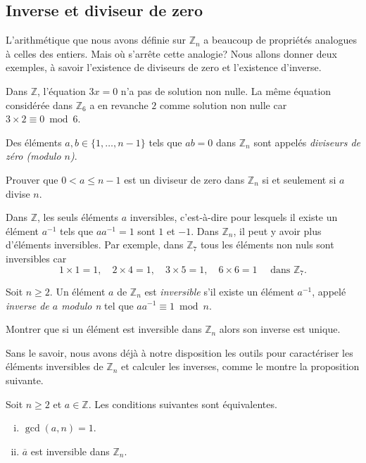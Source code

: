 \documentclass[french,course,oneside,theoremnosection]{lecture}
\newcommand{\Z}{\mathbb{Z}}
\begin{document}
\subsection{Inverse et diviseur de zero}
L'arithmétique que nous avons définie sur $\Z_n$ a beaucoup de propriétés analogues à celles des entiers. Mais où s'arrête cette analogie? Nous allons donner deux exemples, à savoir l'existence de diviseurs de zero et l'existence d'inverse.
\begin{example}
Dans $\Z$, l'équation $3x=0$ n'a pas de solution non nulle. La même équation considérée dans $\Z_6$ a en revanche $2$ comme solution non nulle car $3\times 2 \equiv 0 \bmod 6$.
\end{example}
\begin{definition}
Des éléments $a,b\in\{1, \ldots, n-1\}$ tels que $ab = 0$ dans $\Z_n$ sont appelés \emph{diviseurs de zéro (modulo $n$)}. 
\end{definition}

\begin{exercise}
Prouver que $0 < a \leq n-1$ est un diviseur de zero dans $\Z_n$ si et seulement si $a$ divise $n$.
\end{exercise}

\begin{example}
Dans $\Z$, les seuls éléments $a$ inversibles, c'est-à-dire pour lesquels il existe un élément $a^{-1}$ tels que $aa^{-1}=1$ sont $1$ et $-1$. Dans $\Z_n$, il peut y avoir plus d'éléments inversibles. Par exemple, dans $\Z_7$ tous les éléments non nuls sont inversibles car
\[
1\times 1= 1, \quad 2\times 4=1, \quad 3\times 5=1, \quad 6 \times 6=1 \quad \text{ dans } \Z_7.
\]
\end{example}

\begin{definition}
Soit $n\geq 2$. Un élément $a$ de $\Z_n$ est \emph{inversible} s'il existe un élément $a^{-1}$, appelé \emph{inverse de $a$ modulo n} tel que $aa^{-1} \equiv 1 \bmod n$. 
\end{definition}

\begin{exercise}
Montrer que si un élément est inversible dans $\Z_n$ alors son inverse est unique.
\end{exercise}

Sans le savoir, nous avons déjà à notre disposition les outils pour caractériser les éléments inversibles de $\Z_n$ et calculer les inverses, comme le montre la proposition suivante.
\begin{proposition}\label{prop:inversibles}
Soit $n\geq 2$ et $a\in \Z$. Les conditions suivantes sont équivalentes.
\begin{enumerate}[(i)]
\item $\gcd(a,n)=1$.
\item $\overline{a}$ est inversible dans $\Z_n$.
\end{enumerate}
\end{proposition}
\end{document}
